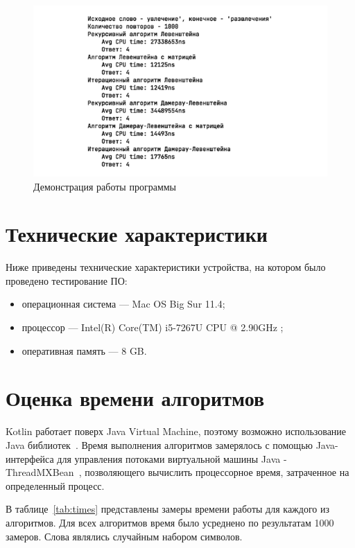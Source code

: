 \documentclass[12pt]{report}
\begin{document}
    \begin{figure}[H]
        \centering
        \includegraphics[scale=1]{img/workSample}
        \caption{Демонстрация работы программы}
        \label{fig:workSample}
    \end{figure}


    \section{Технические характеристики}
    Ниже приведены технические характеристики устройства, на котором было проведено тестирование ПО:
    \begin{itemize}
        \item операционная система --- Mac OS Big Sur 11.4;
        \item процессор --- Intel(R) Core(TM) i5-7267U CPU @ 2.90GHz \cite{i5};
        \item оперативная память --- 8 GB.
    \end{itemize}


    \section{Оценка времени алгоритмов}
    Kotlin работает поверх Java Virtual Machine, поэтому возможно использование Java библиотек~\cite{kotlin}.
    Время выполнения алгоритмов замерялось с помощью Java-интерфейса для управления потоками
    виртуальной машины Java - ThreadMXBean~\cite{threadMXBean}, позволяющего вычислить процессорное время,
    затраченное на определенный процесс.

    В таблице~\ref{tab:times} представлены замеры времени работы для каждого из алгоритмов. Для всех алгоритмов
    время было усреднено по результатам 1000 замеров. Слова являлись случайным набором символов.
\end{document}
